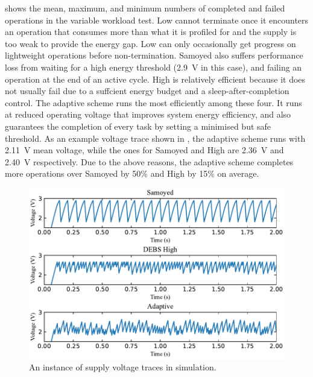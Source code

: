  shows the mean, maximum, and minimum numbers of completed and failed operations in the variable workload test. 
\debs{} Low cannot terminate once it encounters an operation that consumes more than what it is profiled for and the supply is too weak to provide the energy gap. 
\debs{} Low can only occasionally get progress on lightweight operations before non-termination. 
Samoyed also suffers performance loss from waiting for a high energy threshold (\SI{2.9}{\volt} in this case), and failing an operation at the end of an active cycle. 
\debs{} High is relatively efficient because it does not usually fail due to a suffcient energy budget and a sleep-after-completion control. 
The adaptive scheme runs the most efficiently among these four.
It runs at reduced operating voltage that improves system energy efficiency, and also guarantees the completion of every task by setting a minimised but safe threshold.
As an example voltage trace shown in , the adaptive scheme runs with \SI{2.11}{\volt} mean voltage, while the ones for Samoyed and \debs{} High are \SI{2.36}{\volt} and \SI{2.40}{\volt} respectively. 
Due to the above reasons, the adaptive scheme completes more operations over Samoyed by 50\% and \debs{} High by 15\% on average.



\begin{figure}
    \centering
    \includegraphics[width=\columnwidth]{ch5_optic/figures/voltage_traces.pdf}
    \caption{An instance of supply voltage traces in simulation. }
    \label{fig:simulation_voltage}
\end{figure}

